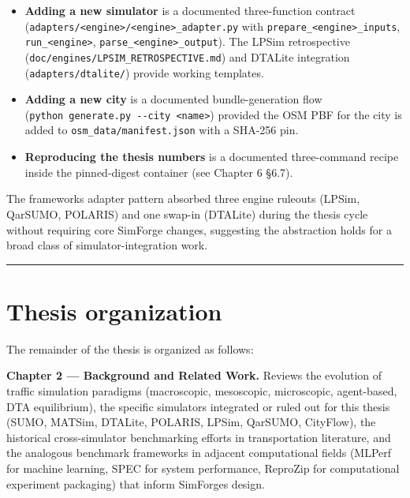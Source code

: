 \begin{itemize}
\item
  \textbf{Adding a new simulator} is a documented three-function
  contract
  (\texttt{adapters/\textless{}engine\textgreater{}/\textless{}engine\textgreater{}\_adapter.py}
  with \texttt{prepare\_\textless{}engine\textgreater{}\_inputs},
  \texttt{run\_\textless{}engine\textgreater{}},
  \texttt{parse\_\textless{}engine\textgreater{}\_output}). The LPSim
  retrospective (\texttt{doc/engines/LPSIM\_RETROSPECTIVE.md}) and
  DTALite integration (\texttt{adapters/dtalite/}) provide working
  templates.
\item
  \textbf{Adding a new city} is a documented bundle-generation flow
  (\texttt{python\ generate.py\ -\/-city\ \textless{}name\textgreater{}})
  provided the OSM PBF for the city is added to
  \texttt{osm\_data/manifest.json} with a SHA-256 pin.
\item
  \textbf{Reproducing the thesis numbers} is a documented three-command
  recipe inside the pinned-digest container (see Chapter 6 §6.7).
\end{itemize}

The framework\textquotesingle s adapter pattern absorbed three engine
ruleouts (LPSim, QarSUMO, POLARIS) and one swap-in (DTALite) during the
thesis cycle without requiring core SimForge changes, suggesting the
abstraction holds for a broad class of simulator-integration work.

\begin{center}\rule{0.5\linewidth}{0.5pt}\end{center}

\section{Thesis organization}\label{16-thesis-organization}

The remainder of the thesis is organized as follows:

\textbf{Chapter 2 --- Background and Related Work.} Reviews the
evolution of traffic simulation paradigms (macroscopic, mesoscopic,
microscopic, agent-based, DTA equilibrium), the specific simulators
integrated or ruled out for this thesis (SUMO, MATSim, DTALite, POLARIS,
LPSim, QarSUMO, CityFlow), the historical cross-simulator benchmarking
efforts in transportation literature, and the analogous benchmark
frameworks in adjacent computational fields (MLPerf for machine
learning, SPEC for system performance, ReproZip for computational
experiment packaging) that inform SimForge\textquotesingle s design.

